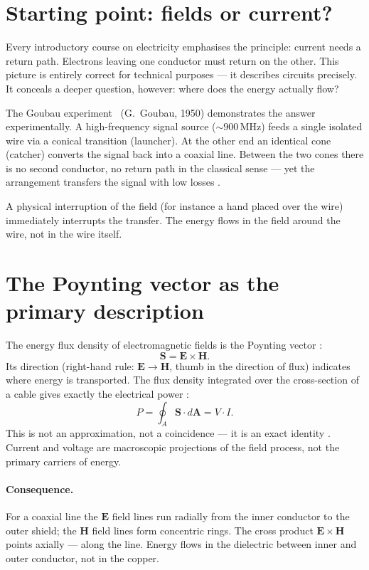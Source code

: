 \section{Starting point: fields or current?}

Every introductory course on electricity emphasises the principle: current
needs a return path. Electrons leaving one conductor must return on the
other. This picture is entirely correct for technical purposes --- it
describes circuits precisely. It conceals a deeper question, however:
where does the energy actually flow?

The Goubau experiment \QM\ (G.~Goubau, 1950) demonstrates the answer
experimentally. A high-frequency signal source (${\sim}900\,\mathrm{MHz}$)
feeds a single isolated wire via a conical transition (launcher). At the
other end an identical cone (catcher) converts the signal back into a
coaxial line. Between the two cones there is no second conductor, no return
path in the classical sense --- yet the arrangement transfers the signal
with low losses \cite{Goubau1950}.

A physical interruption of the field (for instance a hand placed over the
wire) immediately interrupts the transfer. The energy flows in the field
around the wire, not in the wire itself.

\section{The Poynting vector as the primary description}

The energy flux density of electromagnetic fields is the Poynting vector
\cite{Stratton1941,Griffiths1999}:
\[
  \mathbf{S} = \mathbf{E} \times \mathbf{H}.
\]
Its direction (right-hand rule: $\mathbf{E} \to \mathbf{H}$, thumb in the
direction of flux) indicates where energy is transported. The flux density
integrated over the cross-section of a cable gives exactly the electrical
power \EM:
\[
  P = \oint_A \mathbf{S} \cdot d\mathbf{A} = V \cdot I.
\]
This is not an approximation, not a coincidence --- it is an exact identity
\cite{Griffiths1999}. Current and voltage are macroscopic projections of the
field process, not the primary carriers of energy.

\paragraph{Consequence.}
For a coaxial line the $\mathbf{E}$ field lines run radially from the inner
conductor to the outer shield; the $\mathbf{H}$ field lines form concentric
rings. The cross product $\mathbf{E}\times\mathbf{H}$ points axially ---
along the line. Energy flows in the dielectric between inner and outer
conductor, not in the copper.

